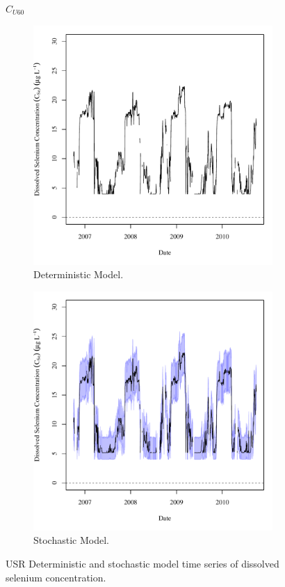 \subfiguremid
\begin{landscape}
	\begin{figure}
		$ C_{U60} $
		\begin{subfigure}{0.7\textwidth}
			\centering
			\includegraphics[width=\tableCustomSize]{"Figures/Results_USR/Deterministic/c TS TIM"}
			\caption{Deterministic Model.}
		\end{subfigure}%
		\begin{subfigure}{0.7\textwidth}
			\centering
			\includegraphics[width=\tableCustomSize]{"Figures/Results_USR/Stochastic/c TS TIM"}
			\caption{Stochastic Model.}
		\end{subfigure}
		\caption{USR Deterministic and stochastic model time series of dissolved selenium concentration.}
	\end{figure}
\end{landscape}

